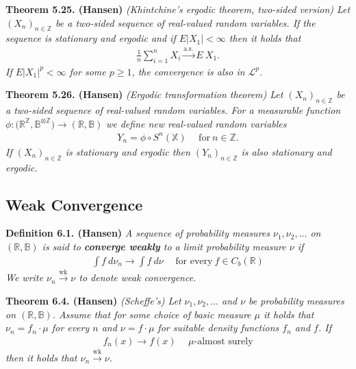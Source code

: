 \documentclass[a4paper,12pt,openany]{book}
\begin{document}
\textbf{Theorem 5.25. (Hansen)} \emph{(Khintchine's ergodic theorem, two-sided version) Let \((X_n)_{n\in\mathbb{Z}}\) be a two-sided sequence of real-valued random variables. If the sequence is stationary and ergodic and if \(E\vert X_1\vert <\infty\) then it holds that}
\begin{align*}
    \frac{1}{n}\sum_{i=1}^nX_i\stackrel{\text{a.s.}}{\to} E\ X_1.\tag{5.30}
\end{align*}
\emph{If \(E\vert X_1\vert^p<\infty\) for some \(p\ge 1\), the convergence is also in \(\mathcal{L}^p\).}

\textbf{Theorem 5.26. (Hansen)} \emph{(Ergodic transformation theorem) Let \((X_n)_{n\in\mathbb{Z}}\) be a two-sided sequence of real-valued random variables. For a measurable function} \(\phi : \big(\mathbb{R}^{\mathbb{Z}},\mathbb{B}^{\otimes\mathbb{Z}}\big)\to (\mathbb{R},\mathbb{B})\) \emph{we define new real-valued random variables}
\begin{align*}
    Y_n=\phi\circ S^{n}(\mathbb{X})\hspace{15pt}\text{for}\ n\in\mathbb{Z}.
\end{align*}
\emph{If \((X_n)_{n\in\mathbb{Z}}\) is stationary and ergodic then \((Y_n)_{n\in\mathbb{Z}}\) is also stationary and ergodic.}

\hypertarget{weak-convergence}{%
\subsection{Weak Convergence}\label{weak-convergence}}

\textbf{Definition 6.1. (Hansen)} \emph{A sequence of probability measures \(\nu_1,\nu_2,...\) on \((\mathbb{R},\mathbb{B})\) is said to \textbf{converge weakly} to a limit probability measure \(\nu\) if}
\begin{align*}
    \int f\ d\nu_n\to \int f\ d\nu\hspace{15pt}\text{for every}\ f\in C_b(\mathbb{R})\tag{6.2}
\end{align*}
\emph{We write \(\nu_n\stackrel{\text{wk}}{\to} \nu\) to denote weak convergence.}

\textbf{Theorem 6.4. (Hansen)} \emph{(Scheffe's) Let \(\nu_1,\nu_2,...\) and \(\nu\) be probability measures on \((\mathbb{R},\mathbb{B})\). Assume that for some choice of basic measure \(\mu\) it holds that \(\nu_n=f_n\cdot \mu\) for every \(n\) and \(\nu = f\cdot \mu\) for suitable density functions \(f_n\) and \(f\). If}
\begin{align*}
    f_n(x)\to f(x)\hspace{15pt}\mu\text{-almost surely}
\end{align*}
\emph{then it holds that \(\nu_n\stackrel{\text{wk}}{\to} \nu\).}
\end{document}
